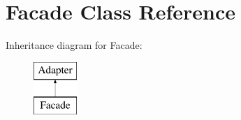 \hypertarget{classrjakes_1_1_rjakes_simple_f_m_1_1_facade}{\section{Facade Class Reference}
\label{classrjakes_1_1_rjakes_simple_f_m_1_1_facade}
}
Inheritance diagram for Facade\+:\begin{figure}[H]
\begin{center}
\leavevmode
\includegraphics[height=2.000000cm]{classrjakes_1_1_rjakes_simple_f_m_1_1_facade}
\end{center}
\end{figure}
